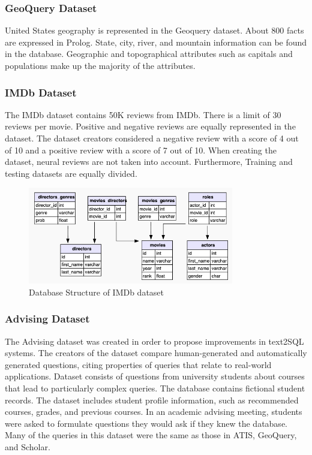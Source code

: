 \subsubsection*{GeoQuery Dataset}

United States geography is represented in the Geoquery dataset. About 800 facts are expressed in Prolog. State, city, river, and mountain information can be found in the database. Geographic and topographical attributes such as capitals and populations make up the majority of the attributes.

\subsubsection*{IMDb Dataset}

The IMDb dataset contains 50K reviews from IMDb. There is a limit of 30 reviews per movie. Positive and negative reviews are equally represented in the dataset. The dataset creators considered a negative review with a score of 4 out of 10 and a positive review with a score of 7 out of 10. When creating the dataset, neural reviews are not taken into account. Furthermore, Training and testing datasets are equally divided.

\begin{figure}[htb]
    \centering
    \includegraphics[width=0.8\textwidth]{pics/db/IMDb.png}
    \caption{Database Structure of IMDb dataset}
    \label{fig:IMDb}
\end{figure}

\subsubsection*{Advising Dataset}

The Advising dataset was created in order to propose improvements in text2SQL systems. The creators of the dataset compare human-generated and automatically generated questions, citing properties of queries that relate to real-world applications. Dataset consists of questions from university students about courses that lead to particularly complex queries. The database contains fictional student records. The dataset includes student profile information, such as recommended courses, grades, and previous courses. In an academic advising meeting, students were asked to formulate questions they would ask if they knew the database. Many of the queries in this dataset were the same as those in ATIS, GeoQuery, and Scholar.

